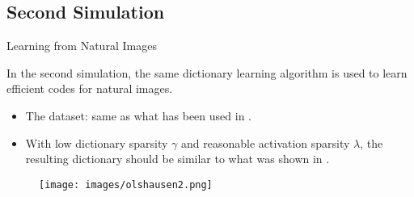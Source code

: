 \documentclass{beamer}
\newlength\figurewidth
\newlength\figureheight
\begin{document}
\subsection{Second Simulation}
\begin{frame}{Learning from Natural Images}

In the second simulation, the same dictionary learning algorithm is used to learn efficient codes for natural images.

\begin{itemize}
	\item The dataset: same as what has been used in \citet{Olshausen:1996p2797}.
	\item With low dictionary sparsity $\gamma$ and reasonable activation sparsity $\lambda$, the resulting dictionary should be similar to what was shown in \citet{Olshausen:1996p2797}.
\end{itemize}

\begin{figure}
  \centering
\texttt{[image: images/olshausen2.png]}
\end{figure}

\end{frame}


\newcommand{\nepage}[2]{%
\underline{#2}

\begin{columns}
\begin{column}{.45\textwidth}
\begin{figure}
  \centering
  \texttt{[image: images/ag2-\#1.png]}
  \caption{Learned (${\hat A}$) / Receptive Fields}
\end{figure}
\end{column}


\begin{column}{.45\textwidth}
\begin{figure}
  \centering
  \texttt{[image: images/xg2-\#1.png]}
  \caption{Top examples}
\end{figure}
\end{column}
\end{columns}

\vspace{-.3cm}

\setlength\figurewidth{0.5\textwidth}
\setlength\figureheight{0.1\textwidth}
\begin{figure}
  \centering
  
  \caption{Loss against $X_{all}$}
\end{figure}
}%
\end{document}
